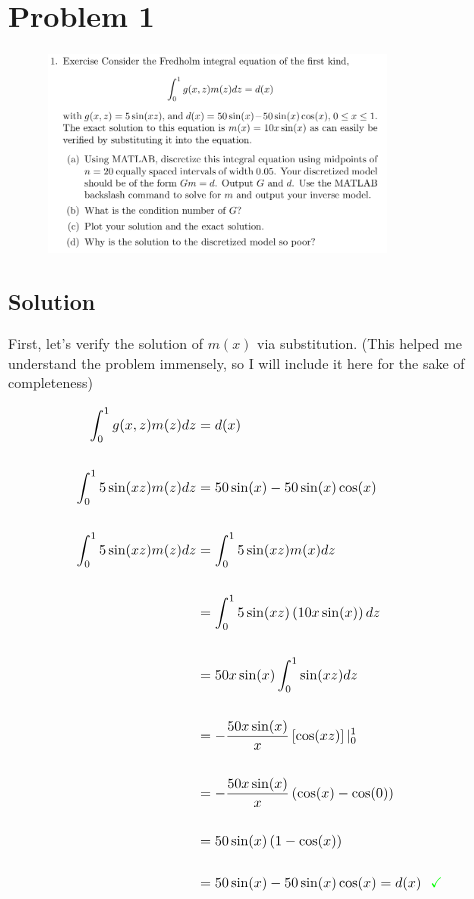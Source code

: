 
\begingroup
\allowdisplaybreaks

\newpage
\section*{Problem 1}

\begin{figure}[h]
	\centering
	\includegraphics[width=0.8\textwidth]{./images/problem_1_statement.png}
\end{figure}

\subsection*{Solution}

First, let's verify the solution of $m(x)$ via substitution. (This helped me understand the problem immensely, so I will include it here for the sake of completeness)

\begin{align*}
	\int_{0}^{1} g(x,z) m(z) dz &= d(x) \\
	\\
	\int_{0}^{1} 5 \sin(xz) m(z) dz &= 50 \sin(x) - 50 \sin(x) \cos(x) \\
	\\
	\int_{0}^{1} 5 \sin(xz) m(z) dz &= \int_{0}^{1} 5 \sin(xz) m(x) dz \\
	\\
	&= \int_{0}^{1} 5 \sin(xz) \left( 10 x \sin(x) \right) dz \\
	\\
	&= 50 x \sin(x) \int_{0}^{1} \sin(xz) dz \\
	\\
	&= - \frac{50 x \sin(x)}{x} \left[ \cos(xz) \right] |_{0}^{1} \\
	\\
	&= - \frac{50 x \sin(x)}{x} \left( \cos(x) - \cos(0) \right) \\
	\\
	&= 50 \sin(x) \left( 1 - \cos(x) \right) \\
	\\
	&= 50 \sin(x) - 50 \sin(x) \cos(x) = d(x) \,\,\,\, \textcolor{green}{\checkmark}
\end{align*}
	
